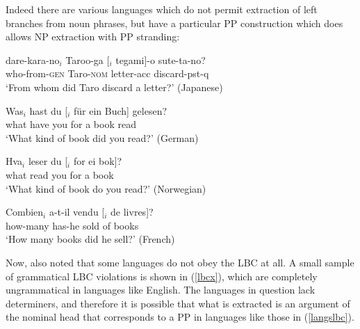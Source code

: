 \documentclass[output=paper]{langsci/langscibook}
\begin{document}
\noindent
Indeed there are various  languages  which do not permit extraction of left branches from noun phrases, 
but have a particular PP construction which does allows NP extraction with PP stranding:

\ea
\ea \gll dare-kara-no$_i$  Taroo-ga  [\spc$_i$  tegami]-o  sute-ta-no?\\
who-from-\textsc{gen}  Taro-\textsc{nom}  letter-{\sc acc}  discard-{\sc pst}-{\sc q}\\
\glt `From whom did Taro discard a letter?' \hfill (Japanese)

\ex \gll Was$_i$  hast  du  [\spc$_i$  f\"{u}r  ein  Buch]  gelesen?\\
 what have  you {} for  a  book  read\\
 \glt `What kind of book did you read?' \hfill (German)

\ex \gll Hva$_i$  leser  du  [\spc$_i$  for  ei  bok]?\\
what  read  you {} for  a   book\\
\glt `What kind of book do you read?' \hfill (Norwegian)



\ex \gll Combien$_i$  a-t-il  vendu  [\spc$_i$  de  livres]?\\
how-many  has-he  sold {} of  books\\
\glt `How many books did he sell?' \hfill (French)

 \z \label{langslbc}
\z


Now,  \citet{Ross67} also  noted that some languages do not obey the LBC at all. A small sample of grammatical LBC violations is shown  in (\ref{lbcx}), which are completely ungrammatical in languages like English. The languages
 in question lack determiners, and therefore it is possible that what is extracted is an argument of the nominal head
that corresponds to a PP in languages like those in (\ref{langslbc}). 
 
\end{document}
